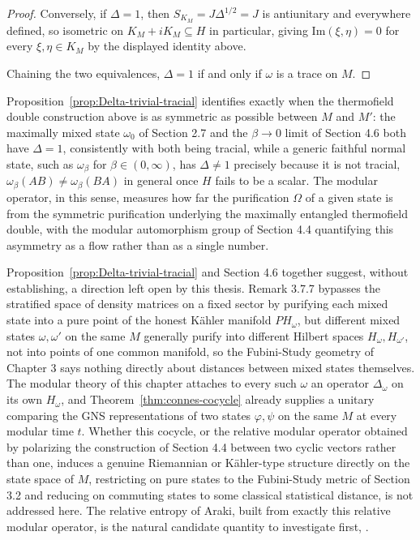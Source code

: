 \begin{proof}
	Conversely, if $\Delta=1$, then $S_{K_M}=J\Delta^{1/2}=J$ is antiunitary and everywhere defined, so isometric on $K_M+iK_M\subseteq H$ in particular, giving $\mathrm{Im}(\xi,\eta)=0$ for every $\xi,\eta\in K_M$ by the displayed identity above.
	
	Chaining the two equivalences, $\Delta=1$ if and only if $\omega$ is a trace on $M$.
\end{proof}

\begin{remark}
	Proposition~\ref{prop:Delta-trivial-tracial} identifies exactly when the thermofield double construction above is as symmetric as possible between $M$ and $M'$: the maximally mixed state $\omega_0$ of Section 2.7 and the $\beta\to0$ limit of Section 4.6 both have $\Delta=1$, consistently with both being tracial, while a generic faithful normal state, such as $\omega_\beta$ for $\beta\in(0,\infty)$, has $\Delta\neq1$ precisely because it is not tracial, $\omega_\beta(AB)\neq\omega_\beta(BA)$ in general once $H$ fails to be a scalar. The modular operator, in this sense, measures how far the purification $\Omega$ of a given state is from the symmetric purification underlying the maximally entangled thermofield double, with the modular automorphism group of Section 4.4 quantifying this asymmetry as a flow rather than as a single number.
\end{remark}

\begin{remark}
	Proposition~\ref{prop:Delta-trivial-tracial} and Section 4.6 together suggest, without establishing, a direction left open by this thesis. Remark 3.7.7 bypasses the stratified space of density matrices on a fixed sector by purifying each mixed state into a pure point of the honest Kähler manifold $PH_\omega$, but different mixed states $\omega,\omega'$ on the same $M$ generally purify into different Hilbert spaces $H_\omega,H_{\omega'}$, not into points of one common manifold, so the Fubini-Study geometry of Chapter 3 says nothing directly about distances between mixed states themselves. The modular theory of this chapter attaches to every such $\omega$ an operator $\Delta_\omega$ on its own $H_\omega$, and Theorem~\ref{thm:connes-cocycle} already supplies a unitary comparing the GNS representations of two states $\varphi,\psi$ on the same $M$ at every modular time $t$. Whether this cocycle, or the relative modular operator obtained by polarizing the construction of Section 4.4 between two cyclic vectors rather than one, induces a genuine Riemannian or Kähler-type structure directly on the state space of $M$, restricting on pure states to the Fubini-Study metric of Section 3.2 and reducing on commuting states to some classical statistical distance, is not addressed here. The relative entropy of Araki, built from exactly this relative modular operator, is the natural candidate quantity to investigate first, \cite[TODO: collocazione precisa]{TODO-Araki}.
\end{remark}

